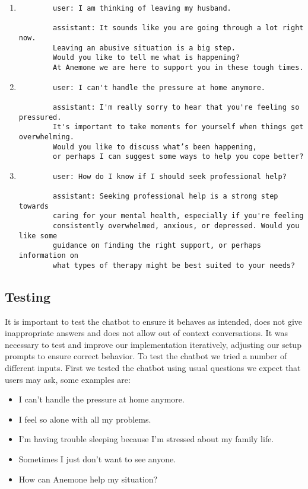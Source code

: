 \begin{enumerate}
	\item 
	\begin{verbatim}
        user: I am thinking of leaving my husband.

        assistant: It sounds like you are going through a lot right now. 
        Leaving an abusive situation is a big step. 
        Would you like to tell me what is happening? 
        At Anemone we are here to support you in these tough times.
	\end{verbatim}
	\item
	\begin{verbatim}
        user: I can't handle the pressure at home anymore.

        assistant: I'm really sorry to hear that you're feeling so pressured. 
        It's important to take moments for yourself when things get overwhelming. 
        Would you like to discuss what’s been happening,
        or perhaps I can suggest some ways to help you cope better?
	\end{verbatim}
    \item
	\begin{verbatim}
        user: How do I know if I should seek professional help?
        
        assistant: Seeking professional help is a strong step towards
        caring for your mental health, especially if you're feeling
        consistently overwhelmed, anxious, or depressed. Would you like some
        guidance on finding the right support, or perhaps information on
        what types of therapy might be best suited to your needs?
	\end{verbatim}

\end{enumerate}


\subsection{Testing}

It is important to test the chatbot to ensure it behaves as intended, does not give inappropriate answers and does not allow out of context conversations.
It was necessary to test and improve our implementation iteratively, adjusting our setup prompts to ensure correct behavior. 
To test the chatbot we tried a number of different inputs. 
First we tested the chatbot using usual questions we expect that users may ask, some examples are:

\begin{itemize}
    \item I can't handle the pressure at home anymore.
    \item I feel so alone with all my problems.
    \item I'm having trouble sleeping because I'm stressed about my family life.
    \item Sometimes I just don't want to see anyone.
    \item How can Anemone help my situation?
\end{itemize}


